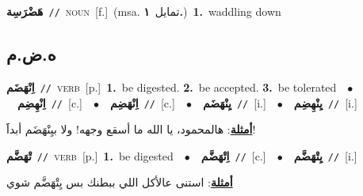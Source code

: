 \documentclass[10pt,a4paper,twoside]{article} %
\begin{document}
\begin{multicols}{2}
{\setlength\topsep{0pt}\textbf{\foreignlanguage{arabic}{هَضْرَسِة}}\ {\color{gray}\texttt{//}\color{black}}\ \textsc{noun}\ [f.]\ \color{gray}(msa. \foreignlanguage{arabic}{تمايل}~\foreignlanguage{arabic}{\textbf{١.}})\color{black}\ \textbf{1.}~waddling down\ } \vspace{2mm}

\vspace{-3mm}
\subsection*{\color{blue}\foreignlanguage{arabic}{ه.ض.م}\color{blue}{}} 

{\setlength\topsep{0pt}\textbf{\foreignlanguage{arabic}{اِنْهَضَم}}\ {\color{gray}\texttt{//}\color{black}}\ \textsc{verb}\ [p.]\ \textbf{1.}~be digested.  \textbf{2.}~be accepted.  \textbf{3.}~be tolerated\ \ $\bullet$\ \ \setlength\topsep{0pt}\textbf{\foreignlanguage{arabic}{اِنْهِضِم}}\ {\color{gray}\texttt{//}\color{black}}\ [c.]\ \ $\bullet$\ \ \setlength\topsep{0pt}\textbf{\foreignlanguage{arabic}{اِنْهَضِم}}\ {\color{gray}\texttt{//}\color{black}}\ [c.]\ \ $\bullet$\ \ \setlength\topsep{0pt}\textbf{\foreignlanguage{arabic}{يِنْهَضَم}}\ {\color{gray}\texttt{//}\color{black}}\ [i.]\ \ $\bullet$\ \ \setlength\topsep{0pt}\textbf{\foreignlanguage{arabic}{يِنْهِضِم}}\ {\color{gray}\texttt{//}\color{black}}\ [i.]\  \begin{flushright}\color{gray}\foreignlanguage{arabic}{\textbf{\underline{\foreignlanguage{arabic}{أمثلة}}}: هالمحمود، يا الله ما أسقع وجهه! ولا بيِنْهَضَم أبداََ!}\end{flushright}\color{black}} \vspace{2mm}

{\setlength\topsep{0pt}\textbf{\foreignlanguage{arabic}{تْهَضَّم}}\ {\color{gray}\texttt{//}\color{black}}\ \textsc{verb}\ [p.]\ \textbf{1.}~be digested\ \ $\bullet$\ \ \setlength\topsep{0pt}\textbf{\foreignlanguage{arabic}{اِتْهَضَّم}}\ {\color{gray}\texttt{//}\color{black}}\ [c.]\ \ $\bullet$\ \ \setlength\topsep{0pt}\textbf{\foreignlanguage{arabic}{يِتْهَضَّم}}\ {\color{gray}\texttt{//}\color{black}}\ [i.]\  \begin{flushright}\color{gray}\foreignlanguage{arabic}{\textbf{\underline{\foreignlanguage{arabic}{أمثلة}}}: استنى عالأكل اللي ببطنك بس يِتْهَضَّم شوي}\end{flushright}\color{black}} \vspace{2mm}


\end{multicols}
\end{document}
